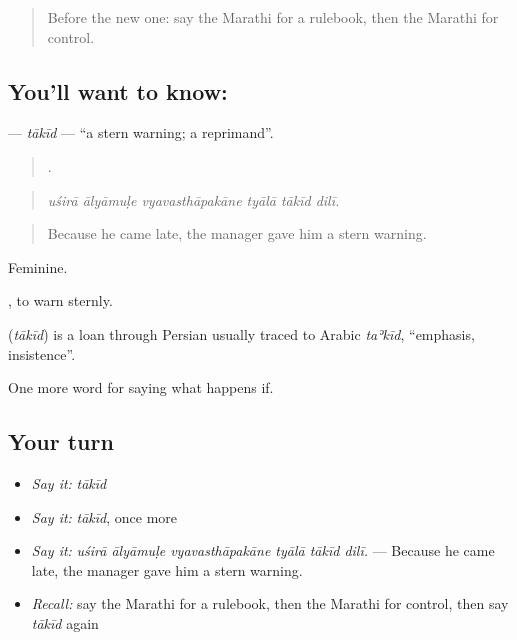 \label{lesson:MR-C542-takid}



\begin{quote}
Before the new one: say the Marathi for a rulebook, then the Marathi for control.
\end{quote}

\subsection*{You'll want to know: }
\textbf{} — \emph{tākīd} — \textquotedblleft{}a stern warning; a reprimand\textquotedblright{}.

\begin{quote}
     .
\end{quote}

\begin{quote}
\emph{uśirā ālyāmuḷe vyavasthāpakāne tyālā tākīd dilī.}
\end{quote}

\begin{quote}
Because he came late, the manager gave him a stern warning.
\end{quote}

Feminine.

 , to warn sternly.

\begin{cousinweb}
\textbf{} (\emph{tākīd}) is a loan through Persian usually traced to Arabic \emph{taʾkīd}, \textquotedblleft{}emphasis, insistence\textquotedblright{}.
\end{cousinweb}

\begin{grammarlens}[title={What you've built}]
One more word for saying what happens if.
\end{grammarlens}

\subsection*{Your turn}
\begin{itemize}
\raggedright
  \item \emph{Say it:} \emph{tākīd}
  \item \emph{Say it:} \emph{tākīd}, once more
  \item \emph{Say it:} \emph{uśirā ālyāmuḷe vyavasthāpakāne tyālā tākīd dilī.} — Because he came late, the manager gave him a stern warning.
  \item \emph{Recall:} say the Marathi for a rulebook, then the Marathi for control, then say \emph{tākīd} again
\end{itemize}

